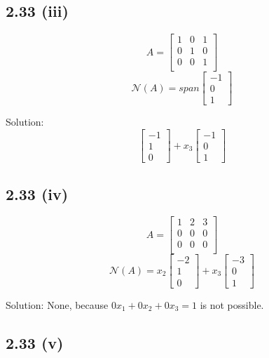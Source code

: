 \documentclass[letterpaper,12pt]{article}
\theoremstyle{definition}
\begin{document}
\subsection*{2.33 (iii)}

\[A =
\begin{bmatrix}
    1 & 0 & 1 \\
    0 & 1 & 0 \\
    0 & 0 & 1 \\
\end{bmatrix}
\]
\[ \mathscr{N} (A) = span 
\begin{bmatrix}
    -1 \\
    0\\
    1
\end{bmatrix}
\]

Solution:
\[
\begin{bmatrix}
    -1\\1\\0
\end{bmatrix}
+
x_3
\begin{bmatrix}
    -1\\0\\1
\end{bmatrix}
\]


\subsection*{2.33 (iv)}

\[A =
\begin{bmatrix}
    1 & 2 & 3 \\
    0 & 0 & 0 \\
    0 & 0 & 0 \\
\end{bmatrix}
\]
\[ \mathscr{N} (A) = x_2
\begin{bmatrix}
    -2 \\
    1\\
    0
\end{bmatrix}
+x_3
\begin{bmatrix}
    -3 \\
    0\\
    1
\end{bmatrix}
\]

Solution: None, because $0x_1 + 0x_2 +0x_3  = 1$ is not possible.

\subsection*{2.33 (v)}
\end{document}
